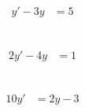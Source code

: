 \documentclass{article}
\begin{document}
\subsection{}

\begin{align*}
	y'-3y&= 5 \\
\end{align*}

\subsection{}

\begin{align*}
	2y'-4y&= 1 \\
\end{align*}

\subsection{}

\begin{align*}
	10y'&=2y -3 \\
\end{align*}
\end{document}
